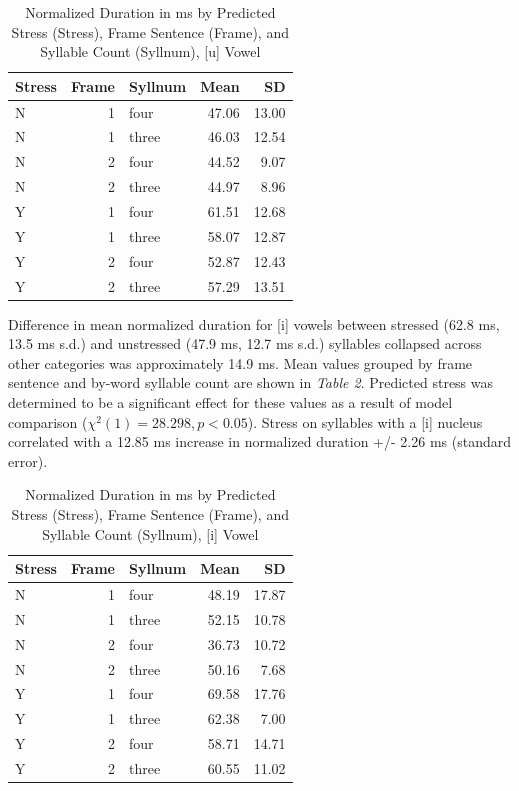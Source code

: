 \documentclass[english,man]{apa6}
\theoremstyle{definition}
\theoremstyle{definition}
\theoremstyle{definition}
\theoremstyle{remark}
\begin{document}
\begin{table}

\caption{\label{tab:Table1}Normalized Duration in ms by Predicted Stress (Stress), Frame Sentence (Frame), and Syllable Count (Syllnum), [u] Vowel}
\centering
\begin{tabular}[t]{l|r|l|r|r}
\hline
Stress & Frame & Syllnum & Mean & SD\\
\hline
N & 1 & four & 47.06 & 13.00\\
\hline
N & 1 & three & 46.03 & 12.54\\
\hline
N & 2 & four & 44.52 & 9.07\\
\hline
N & 2 & three & 44.97 & 8.96\\
\hline
Y & 1 & four & 61.51 & 12.68\\
\hline
Y & 1 & three & 58.07 & 12.87\\
\hline
Y & 2 & four & 52.87 & 12.43\\
\hline
Y & 2 & three & 57.29 & 13.51\\
\hline
\end{tabular}
\end{table}

Difference in mean normalized duration for {[}i{]} vowels between
stressed (62.8 ms, 13.5 ms s.d.) and unstressed (47.9 ms, 12.7 ms s.d.)
syllables collapsed across other categories was approximately 14.9 ms.
Mean values grouped by frame sentence and by-word syllable count are
shown in \textit{Table 2}. Predicted stress was determined to be a
significant effect for these values as a result of model comparison
(\(\chi^2(1) = 28.298, p < 0.05\)). Stress on syllables with a {[}i{]}
nucleus correlated with a 12.85 ms increase in normalized duration +/-
2.26 ms (standard error).

\begin{table}

\caption{\label{tab:Table2}Normalized Duration in ms by Predicted Stress (Stress), Frame Sentence (Frame), and Syllable Count (Syllnum), [i] Vowel}
\centering
\begin{tabular}[t]{l|r|l|r|r}
\hline
Stress & Frame & Syllnum & Mean & SD\\
\hline
N & 1 & four & 48.19 & 17.87\\
\hline
N & 1 & three & 52.15 & 10.78\\
\hline
N & 2 & four & 36.73 & 10.72\\
\hline
N & 2 & three & 50.16 & 7.68\\
\hline
Y & 1 & four & 69.58 & 17.76\\
\hline
Y & 1 & three & 62.38 & 7.00\\
\hline
Y & 2 & four & 58.71 & 14.71\\
\hline
Y & 2 & three & 60.55 & 11.02\\
\hline
\end{tabular}
\end{table}
\end{document}
